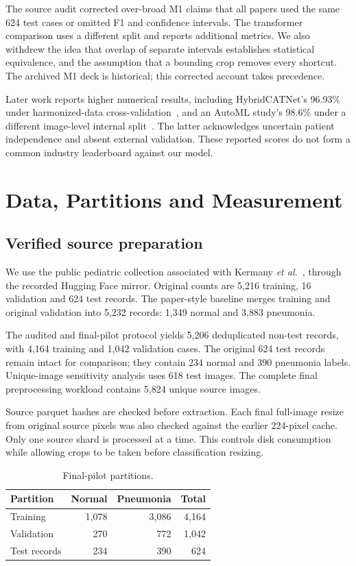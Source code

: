 \documentclass[conference]{IEEEtran}
\begin{document}
The source audit corrected over-broad M1 claims that all papers used the same 624 test cases or omitted F1 and confidence intervals. The transformer comparison uses a different split and reports additional metrics. We also withdrew the idea that overlap of separate intervals establishes statistical equivalence, and the assumption that a bounding crop removes every shortcut. The archived M1 deck is historical; this corrected account takes precedence.

Later work reports higher numerical results, including HybridCATNet's 96.93\% under harmonized-data cross-validation~\cite{hybrid}, and an AutoML study's 98.6\% under a different image-level internal split~\cite{automl}. The latter acknowledges uncertain patient independence and absent external validation. These reported scores do not form a common industry leaderboard against our model.

\section{Data, Partitions and Measurement}
\subsection{Verified source preparation}
We use the public pediatric collection associated with Kermany \emph{et al.}~\cite{data}, through the recorded Hugging Face mirror. Original counts are 5,216 training, 16 validation and 624 test records. The paper-style baseline merges training and original validation into 5,232 records: 1,349 normal and 3,883 pneumonia.

The audited and final-pilot protocol yields 5,206 deduplicated non-test records, with 4,164 training and 1,042 validation cases. The original 624 test records remain intact for comparison; they contain 234 normal and 390 pneumonia labels. Unique-image sensitivity analysis uses 618 test images. The complete final preprocessing workload contains 5,824 unique source images.

Source parquet hashes are checked before extraction. Each final full-image resize from original source pixels was also checked against the earlier 224-pixel cache. Only one source shard is processed at a time. This controls disk consumption while allowing crops to be taken before classification resizing.
\begin{table}[!t]\caption{Final-pilot partitions.}\label{tab:split}\centering\begin{tabular}{lrrr}\toprule\rowcolor{RRlight}Partition & Normal & Pneumonia & Total\\\midrule
Training & 1,078 & 3,086 & 4,164\\
Validation & 270 & 772 & 1,042\\
Test records & 234 & 390 & 624\\\bottomrule\end{tabular}\end{table}
\end{document}
